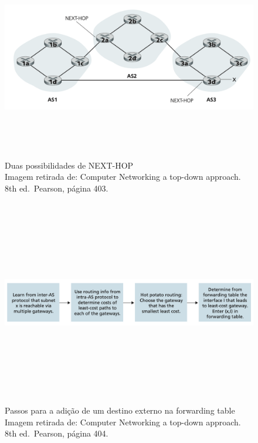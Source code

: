 \begin{figure}[h!]
\centering
\includegraphics[keepaspectratio, width=12cm, height=9cm]{imagens/14/14 - rota com menor next-hop.png}
\caption{Duas possibilidades de NEXT-HOP \\
Imagem retirada de: Computer Networking a top-down approach. 8th
ed.~Pearson, página 403. \\}
\label{fig:Duas possibilidades de NEXT-HOP}
\end{figure}

\begin{figure}[h!]
\centering
\includegraphics[keepaspectratio, width=12cm, height=9cm]{imagens/14/14 - adicao destino.png}
\caption{Passos para a adição de um destino externo na forwarding
table \\
Imagem retirada de: Computer Networking a top-down approach. 8th
ed.~Pearson, página 404. \\}
\label{fig:Passos para a adição de um destino externo na forwarding
table}
\end{figure}


